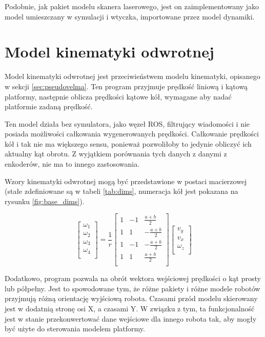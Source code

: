 	Podobnie, jak pakiet modelu skanera laserowego, jest on zaimplementowany jako model umieszczany w symulacji i wtyczka, importowane przez model dynamiki.
	
\section{Model kinematyki odwrotnej}
	\label{sec:transmutator}
	Model kinematyki odwrotnej jest przeciwieństwem modelu kinematyki, opisanego w sekcji \ref{sec:pseudovelma}.
	Ten program przyjmuje prędkość liniową i kątową platformy, następnie oblicza prędkości kątowe kół, wymagane aby nadać platformie zadaną prędkość.
	
	Ten model działa bez symulatora, jako węzeł ROS, filtrujący wiadomości i nie posiada możliwości całkowania wygenerowanych prędkości.
	Całkowanie prędkości kół i tak nie ma większego sensu, ponieważ pozwoliłoby to jedynie obliczyć ich aktualny kąt obrotu.
	Z wyjątkiem porównania tych danych z danymi z enkoderów, nie ma to innego zastosowania.
	
	Wzory kinematyki odwrotnej mogą być przedstawione w postaci macierzowej \cite{wheels} (stałe zdefiniowane są w tabeli \ref{tab:dims}, numeracja kół jest pokazana na rysunku \ref{fig:base_dims}).
	
	\begin{equation}
	\begin{bmatrix}
	\omega_1 \\
	\omega_2 \\
	\omega_3 \\
	\omega_4 \\
	\end{bmatrix}
	=
	\frac{1}{r}
	\begin{bmatrix}
	1 & -1 & \frac{a+b}{2} \\
	1 & 1 & -\frac{a+b}{2} \\
	1 & -1 & -\frac{a+b}{2} \\
	1 & 1 & \frac{a+b}{2} \\
	\end{bmatrix}
	\begin{bmatrix}
	v_y \\
	v_x \\
	\omega_z \\
	\end{bmatrix}
	\end{equation}

	Dodatkowo, program pozwala na obrót wektora wejściowej prędkości o kąt prosty lub półpełny. 
	Jest to spowodowane tym, że różne pakiety i różne modele robotów przyjmują różną orientację wyjściową robota.
	Czasami przód modelu skierowany jest w dodatnią stronę osi X, a czasami Y. W związku z tym, ta funkcjonalność jest w stanie przekonwertować dane wejściowe dla innego robota tak,
	aby mogły być użyte do sterowania modelem platformy.
	

